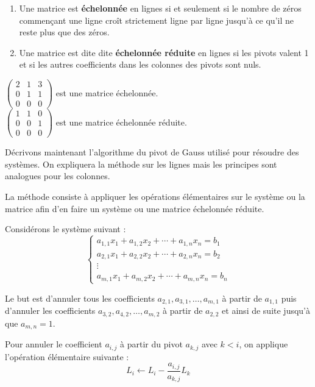 \begin{definition}
	\begin{enumerate}
		\item Une matrice est \textbf{échelonnée} en lignes si et seulement si le nombre de zéros commençant une ligne croît strictement ligne par ligne jusqu'à ce qu'il ne reste plus que des zéros.
		\item Une matrice est dite dite \textbf{échelonnée réduite} en lignes si les pivots valent 1 et si les autres coefficients dans les colonnes des pivots sont nuls.
	\end{enumerate}
\end{definition}

\begin{example}
	$
	\begin{pmatrix}
		2 & 1 & 3 \\
		0 & 1 & 1 \\
		0 & 0 & 0
	\end{pmatrix}
	$
	est une matrice échelonnée.
	\\
	$
	\begin{pmatrix}
		1 & 1 & 0 \\
		0 & 0 & 1 \\
		0 & 0 & 0
	\end{pmatrix}
	$
	est une matrice échelonnée réduite.
\end{example}

\par Décrivons maintenant l'algorithme du pivot de Gauss utilisé pour résoudre des systèmes. On expliquera la méthode sur les lignes mais les principes sont analogues pour les colonnes.
\par \noindent La méthode consiste à appliquer les opérations élémentaires sur le système ou la matrice afin d'en faire un système ou une matrice échelonnée réduite.

Considérons le système suivant :
\[
\begin{cases}
	a_{1,1} x_1 + a_{1,2} x_2 + \cdots + a_{1,n} x_n = b_1 \\
	a_{2,1} x_1 + a_{2,2} x_2 + \cdots + a_{2,n} x_n = b_2 \\
	\vdots \\
	a_{m,1} x_1 + a_{m,2} x_2 + \cdots + a_{m,n} x_n = b_n
\end{cases}
\]

\par Le but est d'annuler tous les coefficients $a_{2,1}, a_{3,1}, \ldots, a_{m,1}$ à partir de $a_{1,1}$ puis d'annuler les coefficients $a_{3,2}, a_{4,2}, \ldots, a_{m,2}$ à partir de $a_{2,2}$ et ainsi de suite jusqu'à que $a_{m,n} = 1$.
\\
\par Pour annuler le coefficient $a_{i,j}$ à partir du pivot $a_{k,j}$ avec $k < i$, on applique l'opération élémentaire suivante :
\[ L_i \leftarrow L_i - \frac{a_{i,j}}{a_{k,j}} L_k \]

